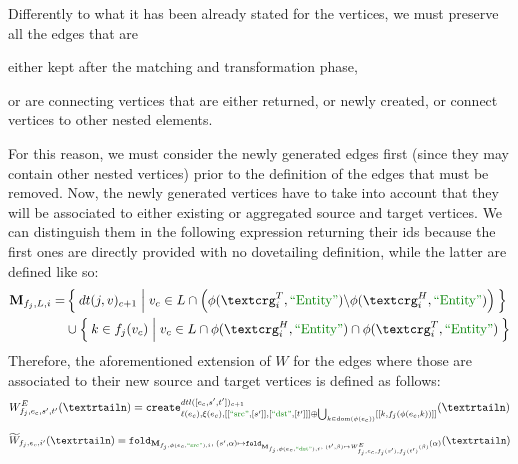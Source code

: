 Differently to what it has been already stated for the vertices, we must preserve all the edges that are 
\begin{mylist}
\item either kept after the matching and transformation phase, 
\item or are connecting vertices that are either returned, or newly created, or connect vertices to other nested elements.
\end{mylist}
   For this reason, we  must consider the newly generated edges first (since they may contain other nested vertices) prior to the definition of the edges that must be removed.
Now, the newly generated vertices have to take into account that they will be associated  to either existing or aggregated source and target vertices. We can distinguish them in the following expression returning their ids because the first ones are directly provided with no dovetailing definition, while the latter are defined like so:
\begin{equation}
\label{eq:M}
\begin{split}
\textbf{M}_{f_j,L,i} = &\Set{dt(j,v)_{c+1}|v_c\in L\cap\left( \phi(\ngraph_i^T,\ONTA)\backslash\phi(\ngraph_i^H,\ONTA)\right)}\\
&\cup\Set{k\in f_j(v_c)|v_c\in L\cap\phi(\ngraph_i^H,\ONTA)\cap\phi(\ngraph_i^T,\ONTA)}\\
\end{split}
\end{equation}
Therefore, the aforementioned extension of $W$ for the edges where those are associated to their new source and target vertices is defined as follows:
\[W_{f_j,e_c,s',t'}^E(\nested)=\texttt{create}^{dtl([e_c,s',t'])_{c+1}}_{\ell(e_c),\xi(e_c),[[\SRC,[s']],[\DST,[t']]]\oplus\bigcup_{k\in\dom(\phi(e_c))} [[k,f_j(\phi(e_c,k))]]}(\nested)\]
\begin{equation}\label{eq:Wtilde}
\widetilde{W}_{f_j,e_c,i'}(\nested) =\texttt{fold}_{\textbf{M}_{f_j,\phi(e_c,\SRC),i},\;(s',\alpha)\mapsto \texttt{fold}_{\textbf{M}_{f_j,\phi(e_c,\DST),i},\;(t',\beta)\mapsto W_{f_j,e_c,f_j(s'),f_j(t')}^E(\beta)}(\alpha)}(\nested)
\end{equation}
